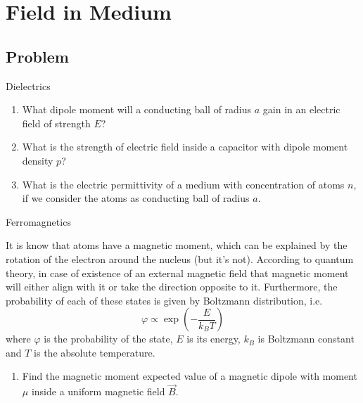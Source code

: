 \section*{Field in Medium}

\subsection*{Problem}

\renewcommand{\labelenumii}{\theenumii}
\renewcommand{\theenumii}{\theenumi.\arabic{enumii}.}

\begin{enumerate}

{\bfseries
\item Dielectrics
}

\begin{enumerate}
    \item What dipole moment will a conducting ball of radius $a$ gain
        in an electric field of strength $E$?

    \item What is the strength of electric field inside a capacitor
        with dipole moment density $p$?

    \item What is the electric permittivity of a medium
        with concentration of atoms $n$,
        if we consider the atoms as conducting ball of radius $a$.
\end{enumerate}

{\bfseries
\item Ferromagnetics
}

It is know
that atoms have a magnetic moment,
which can be explained by
the rotation of the electron around the nucleus (but it's not).
According to quantum theory,
in case of existence of an external magnetic field
that magnetic moment will either align with it
or take the direction opposite to it.
Furthermore,
the probability of each of these states is given by
Boltzmann distribution, i.e.
\begin{equation}
    \varphi \propto \exp(-\frac{E}{k_B T})
\end{equation}
where $\varphi$ is the probability of the state,
$E$ is its energy, $k_B$ is Boltzmann constant
and $T$ is the absolute temperature.


\begin{enumerate}
    \item Find the magnetic moment expected value of 
        a magnetic dipole with moment $\mu$
        inside a uniform magnetic field $\vec{B}$.


\end{enumerate}
\end{enumerate}
